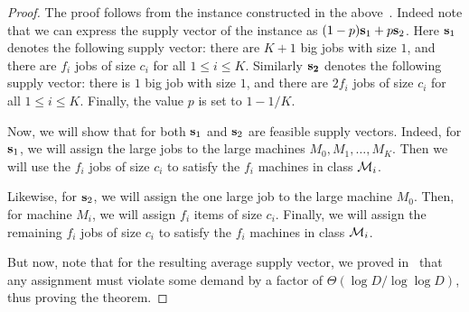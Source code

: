\begin{proof}
The proof follows from the instance constructed in the above~. Indeed note that we can express the supply vector of the instance as $(1-p) {\bf s}_1 + p {\bf s}_2$. Here ${\bf s}_1$ denotes the following supply vector: there are $K+1$ big jobs with size $1$, and there are $f_i$ jobs of size $c_i$ for all $1 \leq i \leq K$. Similarly $\bf{s}_2$ denotes the following supply vector: there is $1$ big job with size $1$, and there are $2f_i$ jobs of size $c_i$ for all $1 \leq i \leq K$. Finally, the value $p$ is set to $1-1/K$.

Now, we will show that for both ${\bf s}_1$ and ${\bf s}_2$ are feasible supply vectors. Indeed, for ${\bf s}_1$, we will assign the large jobs to the large machines $M_0, M_1, \ldots, M_K$. Then we will use the $f_i$ jobs of size $c_i$ to satisfy the $f_i$ machines in class ${\cal M}_i$.

Likewise, for ${\bf s}_2$, we will assign the one large job to the large machine $M_0$. Then, for machine $M_i$, we will assign $f_i$ items of size $c_i$. Finally, we will assign the remaining $f_i$ jobs of size $c_i$ to satisfy the $f_i$ machines in class ${\cal M}_i$.

But now, note that for the resulting average supply vector, we proved in~ that any assignment must violate some demand by a factor of $\Theta(\log D/\log \log D)$, thus proving the theorem.
\end{proof}
